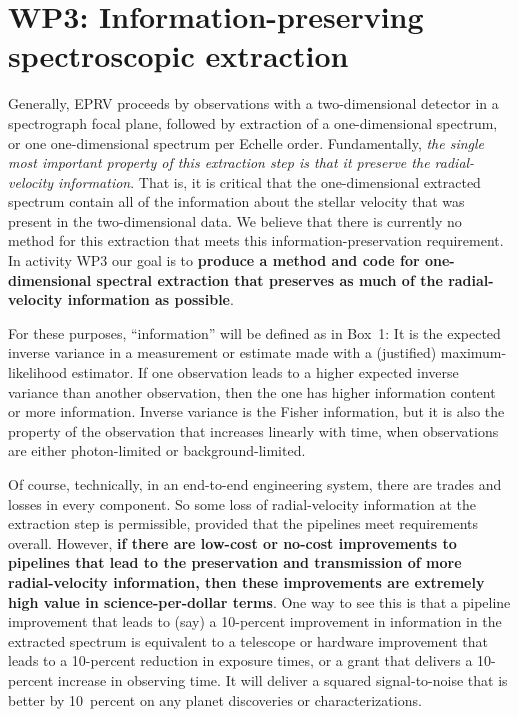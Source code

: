 \documentclass[12pt]{article}
\begin{document}
\section{WP3: Information-preserving spectroscopic extraction}

Generally, EPRV proceeds by observations with a two-dimensional detector in a spectrograph focal plane, followed by extraction of a one-dimensional spectrum, or one one-dimensional spectrum per Echelle order.
Fundamentally, \emph{the single most important property of this extraction step is that it preserve the radial-velocity information}.
That is, it is critical that the one-dimensional extracted spectrum contain all of the information about the stellar velocity that was present in the two-dimensional data.
We believe that there is currently no method for this extraction that meets this information-preservation requirement.
In activity WP3 our goal is to \textbf{produce a method and code for one-dimensional spectral extraction that preserves as much of the radial-velocity information as possible}.

For these purposes, ``information'' will be defined as in Box~1: It is the expected inverse variance in a measurement or estimate made with a (justified) maximum-likelihood estimator.
If one observation leads to a higher expected inverse variance than another observation, then the one has higher information content or more information.
Inverse variance is the Fisher information, but it is also the property of the observation that increases linearly with time, when observations are either photon-limited or background-limited.

Of course, technically, in an end-to-end engineering system, there are trades and losses in every component.
So some loss of radial-velocity information at the extraction step is permissible, provided that the pipelines meet requirements overall.
However, \textbf{if there are low-cost or no-cost improvements to pipelines that lead to the preservation and transmission of more radial-velocity information, then these improvements are extremely high value in science-per-dollar terms}.
One way to see this is that a pipeline improvement that leads to (say) a 10-percent improvement in information in the extracted spectrum is equivalent to a telescope or hardware improvement that leads to a 10-percent reduction in exposure times, or a grant that delivers a 10-percent increase in observing time.
It will deliver a squared signal-to-noise that is better by 10~percent on any planet discoveries or characterizations.
\end{document}

